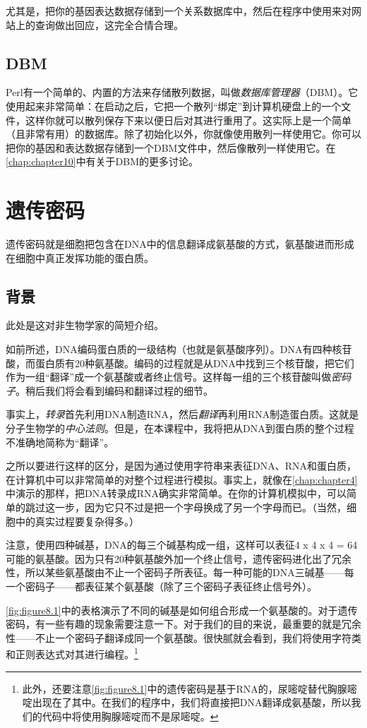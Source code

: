 尤其是，把你的基因表达数据存储到一个关系数据库中，然后在程序中使用来对网站上的查询做出回应，这完全合情合理。

\subsection{DBM}
Perl有一个简单的、内置的方法来存储散列数据，叫做\textit{数据库管理器}（DBM）。它使用起来非常简单：在启动之后，它把一个散列“绑定”到计算机硬盘上的一个文件，这样你就可以散列保存下来以便日后对其进行重用了。这实际上是一个简单（且非常有用）的数据库。除了初始化以外，你就像使用散列一样使用它。你可以把你的基因和表达数据存储到一个DBM文件中，然后像散列一样使用它。在\autoref{chap:chapter10}中有关于DBM的更多讨论。

\section{遗传密码}
遗传密码就是细胞把包含在DNA中的信息翻译成氨基酸的方式，氨基酸进而形成在细胞中真正发挥功能的蛋白质。

\subsection{背景}
此处是这对非生物学家的简短介绍。

如前所述，DNA编码蛋白质的一级结构（也就是氨基酸序列）。DNA有四种核苷酸，而蛋白质有20种氨基酸。编码的过程就是从DNA中找到三个核苷酸，把它们作为一组“翻译”成一个氨基酸或者终止信号。这样每一组的三个核苷酸叫做\textit{密码子}。稍后我们将会看到编码和翻译过程的细节。

事实上，\textit{转录}首先利用DNA制造RNA，然后\textit{翻译}再利用RNA制造蛋白质。这就是分子生物学的\textit{中心法则}。但是，在本课程中，我将把从DNA到蛋白质的整个过程不准确地简称为“翻译”。

之所以要进行这样的区分，是因为通过使用字符串来表征DNA、RNA和蛋白质，在计算机中可以非常简单的对整个过程进行模拟。事实上，就像在\autoref{chap:chapter4}中演示的那样，把DNA转录成RNA确实非常简单。在你的计算机模拟中，可以简单的跳过这一步，因为它只不过是把一个字母换成了另一个字母而已。（当然，细胞中的真实过程要复杂得多。）

注意，使用四种碱基，DNA的每三个碱基构成一组，这样可以表征4 x 4 x 4 = 64可能的氨基酸。因为只有20种氨基酸外加一个终止信号，遗传密码进化出了冗余性，所以某些氨基酸由不止一个密码子所表征。每一种可能的DNA三碱基——每一个密码子——都表征某个氨基酸（除了三个密码子表征终止信号外）。

\autoref{fig:figure8.1}中的表格演示了不同的碱基是如何组合形成一个氨基酸的。对于遗传密码，有一些有趣的现象需要注意一下。对于我们的目的来说，最重要的就是冗余性——不止一个密码子翻译成同一个氨基酸。很快腻就会看到，我们将使用字符类和正则表达式对其进行编程。\footnote{此外，还要注意\autoref{fig:figure8.1}中的遗传密码是基于RNA的，尿嘧啶替代胸腺嘧啶出现在了其中。在我们的程序中，我们将直接把DNA翻译成氨基酸，所以我们的代码中将使用胸腺嘧啶而不是尿嘧啶。}

